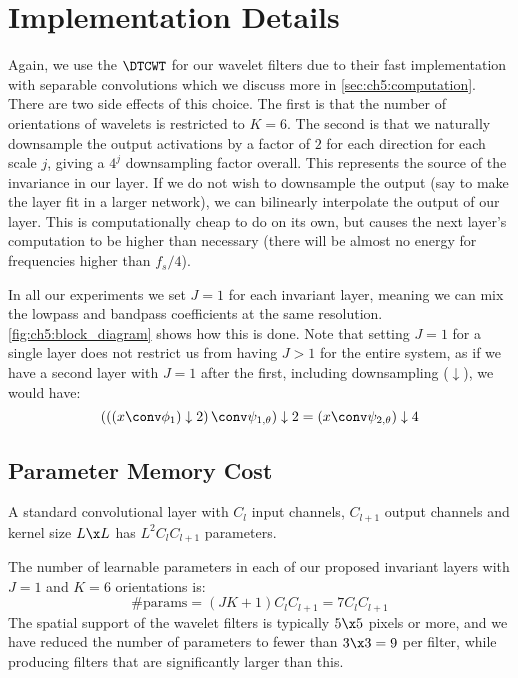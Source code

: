 \section{Implementation Details}\label{sec:ch5:implementation}
Again, we use the $\DTCWT$ \cite{selesnick_dual-tree_2005} for our wavelet filters
due to their fast implementation with separable convolutions
which we discuss more in \autoref{sec:ch5:computation}. There are two side
effects of this choice. The first is that the number of orientations of wavelets
is restricted to $K=6$. The second is that we naturally downsample the output
activations by a factor of $2$ for each direction for each scale $j$, giving a 
$4^j$ downsampling factor overall. This represents the
source of the invariance in our layer. If we do not wish to downsample the
output (say to make the layer fit in a larger network), we can bilinearly
interpolate the output of our layer. This is computationally cheap to do on its
own, but causes the next layer's computation to be higher than necessary (there
will be almost no energy for frequencies higher than $f_s/4$).

In all our experiments we set $J=1$ for each invariant layer,
meaning we can mix the lowpass and bandpass coefficients at the same resolution.
\autoref{fig:ch5:block_diagram} shows how this is done. Note that setting $J=1$ for
a single layer does not restrict us from having $J>1$ for the entire system, as
if we have a second layer with $J=1$ after the first, including downsampling
($\downarrow$), we would have:
%
\begin{equation}
  \left(\left(\left(x \conv \phi_1\right) \downarrow 2\right) \conv \psi_{1, \theta}\right) 
    \downarrow 2 = \left(x \conv \psi_{2, \theta}\right) \downarrow 4
\end{equation}

\subsection{Parameter Memory Cost}\label{sec:ch5:memory}
A standard convolutional layer with $C_l$ input channels, $C_{l+1}$ output channels
and kernel size $L\x L$ has $L^2C_{l}C_{l+1}$ parameters. 

The number of learnable parameters in each of our proposed invariant layers with
$J=1$ and $K=6$ orientations is:
%
\begin{equation}
  \text{\#params} = (JK+1)C_{l}C_{l+1} = 7C_{l}C_{l+1} \label{eq:ch5:num_params}
\end{equation} 
%
The spatial support of the wavelet filters is typically $5\x 5$ pixels or more,
and we have reduced the number of parameters to fewer than $3\x3=9$ per filter, while
producing filters that are significantly larger than this.

